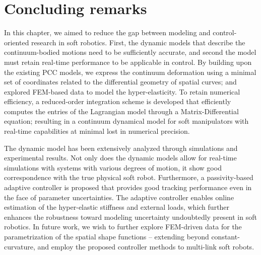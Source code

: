 \section{Concluding remarks}
In this chapter, we aimed to reduce the gap between modeling and control-oriented research in soft robotics. First, the dynamic models that describe the continuum-bodied motions need to be sufficiently accurate, and second the model must retain real-time performance to be applicable in control. By building upon the existing PCC models, we express the continuum deformation using a minimal set of coordinates related to the differential geometry of spatial curves; and explored FEM-based data to model the hyper-elasticity. To retain numerical efficiency, a reduced-order integration scheme is developed that efficiently computes the entries of the Lagrangian model through a Matrix-Differential equation; resulting in a continuum dynamical model for soft manipulators with real-time capabilities at minimal lost in numerical precision. 

The dynamic model has been extensively analyzed through simulations and experimental results. Not only does the dynamic models allow for real-time simulations with systems with various degrees of motion, it show good correspondence with the true physical soft robot. Furthermore, a passivity-based adaptive controller is proposed that provides good tracking performance even in the face of parameter uncertainties. The adaptive controller enables online estimation of the hyper-elastic stiffness and external loads, which further enhances the robustness toward modeling uncertainty undoubtedly present in soft robotics. In future work, we wish to further explore FEM-driven data for the parametrization of the spatial shape functions -- extending beyond constant-curvature, and employ the proposed controller methods to multi-link soft robots.

\vfill